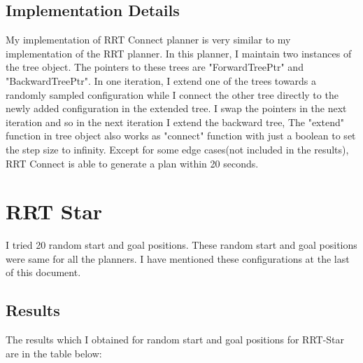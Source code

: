 \documentclass[12pt]{article}
\begin{document}
\subsection{Implementation Details}
My implementation of RRT Connect planner is very similar to my implementation of the RRT planner. In this planner, I maintain two instances of the tree object. The pointers to these trees are "ForwardTreePtr" and "BackwardTreePtr". In one iteration, I extend one of the trees towards a randomly sampled configuration while I connect the other tree directly to the newly added configuration in the extended tree. I swap the pointers in the next iteration and so in the next iteration I extend the backward tree, The "extend" function in tree object also works as "connect" function with just a boolean to set the step size to infinity. Except for some edge cases(not included in the results), RRT Connect is able to generate a plan within 20 seconds.

\section{RRT Star}
I tried 20 random start and goal positions. These random start and goal positions were same for all the planners. I have mentioned these configurations at the last of this document. 

\subsection{Results}
The results which I obtained for random start and goal positions for RRT-Star are in the table below:
\end{document}
